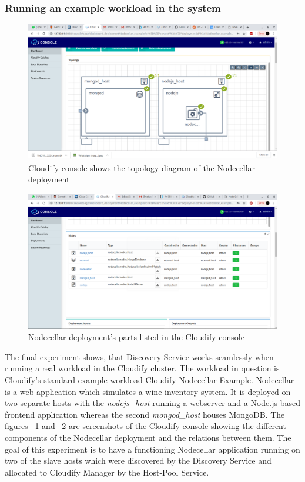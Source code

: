 \subsubsection{Running an example workload in the system}

 \begin{figure}[ht!]
\centering
  \includegraphics[width=\textwidth, keepaspectratio]{consoletopology.png}%
  \caption{Cloudify console shows the topology diagram of the Nodecellar deployment}
  \label{fig:console_topology}
\end{figure}

 \begin{figure}[ht!]
\centering
  \includegraphics[width=\textwidth, keepaspectratio]{console_list.png}%
  \caption{Nodecellar deployment's parts listed in the Cloudify console}
  \label{fig:console_list}
\end{figure}

The final experiment shows, that Discovery Service works seamlessly when running a real workload in the Cloudify cluster. The workload in question is Cloudify's standard example workload Cloudify Nodecellar Example\cite{Nodecellar}. Nodecellar is a web application which simulates a wine inventory system. It is deployed on two separate hosts with the \textit{nodejs\_host} running a webserver and a Node.js based frontend application whereas the second \textit{mongod\_host} houses MongoDB. The figures ~\ref{fig:console_topology} and ~\ref{fig:console_list} are screenshots of the Cloudify console showing the different components of the Nodecellar deployment and the relations between them. The goal of this experiment is to have a functioning Nodecellar application running on two of the slave hosts which were discovered by the Discovery Service and allocated to Cloudify Manager by the Host-Pool Service.


